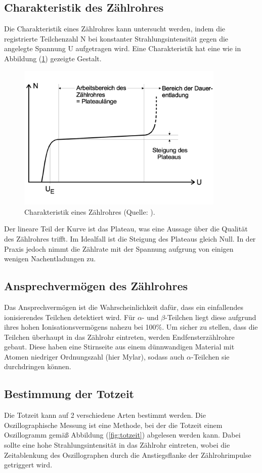 \subsection{Charakteristik des Zählrohres}
Die Charakteristik eines Zählrohres kann untersucht werden, 
indem die registrierte Teilchenzahl N bei konstanter Strahlungsintensität gegen die angelegte Spannung U aufgetragen wird.
Eine Charakteristik hat eine wie in Abbildung (\ref{fig:char}) gezeigte Gestalt.

\begin{figure}
            \centering
               \includegraphics[height=7cm]{char.pdf}
               \caption{Charakteristik eines Zählrohres (Quelle: \cite{V703}).}
               \label{fig:char}
        \end{figure}

\noindent
Der lineare Teil der Kurve ist das Plateau, was eine Aussage über die Qualität des Zählrohres trifft.
Im Idealfall ist die Steigung des Plateaus gleich Null.
In der Praxis jedoch nimmt die Zählrate mit der Spannung aufgrung von einigen wenigen Nachentladungen zu.

\subsection{Ansprechvermögen des Zählrohres}
Das Ansprechvermögen ist die Wahrscheinlichkeit dafür, dass ein einfallendes ionisierendes Teilchen detektiert wird.
Für $\alpha$- und $\beta$-Teilchen liegt diese aufgrund ihres hohen Ionisationsvermögens nahezu bei 100$\%$.
Um sicher zu stellen, dass die Teilchen überhaupt in das Zählrohr eintreten, werden Endfensterzählrohre gebaut.
Diese haben eine Stirnseite aus einem dünnwandigen Material mit Atomen niedriger Ordnungszahl (hier Mylar), 
sodass auch $\alpha$-Teilchen sie durchdringen können.

\subsection{Bestimmung der Totzeit}
Die Totzeit kann auf 2 verschiedene Arten bestimmt werden.
Die Oszillographische Messung ist eine Methode, bei der die Totzeit einem Oszillogramm gemäß Abbildung (\ref{fig:totzeit}) abgelesen werden kann.
Dabei sollte eine hohe Strahlungsintensität in das Zählrohr eintreten, 
wobei die Zeitablenkung des Oszillographen durch die Anstiegsflanke der Zählrohrimpulse getriggert wird.

